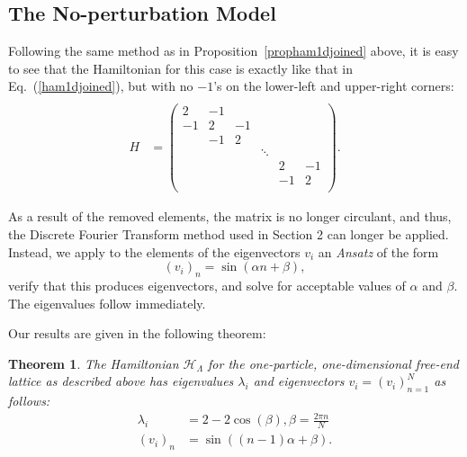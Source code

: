 \documentclass{article}
\newtheorem{theorem}{Theorem}
\numberwithin{equation}{section}
\numberwithin{theorem}{section}
\numberwithin{proposition}{section}
\numberwithin{lemma}{section}
\numberwithin{corollary}{section}
\numberwithin{definition}{section}
\begin{document}
\subsection{The No-perturbation Model}

Following the same method as in Proposition~\ref{propham1djoined} above, it is easy to see that the Hamiltonian for this case is exactly like that in Eq.~(\ref{ham1djoined}), but with no $-1$'s on the lower-left and upper-right corners:
	\begin{align*}
	\\ H &= \left(
		\begin{array}{cccccc}
			2 & -1 &  &  &  &  \\
			-1 & 2 & -1 &  &  &  \\
			 & -1 & 2 &  &  &  \\
			 &  &  & \ddots &  &  \\
			 &  &  &  & 2 & -1 \\
			 &  &  &  & -1 & 2 \\
		\end{array}
	\right).
	\end{align*}


	
As a result of the removed elements, the matrix is no longer circulant, and thus, the Discrete Fourier Transform method used in Section 2 can longer be applied. Instead, we apply to the elements of the eigenvectors $v_i$ an \textit{Ansatz} of the form
	\[
	(v_i)_n = \sin(\alpha n + \beta),
	\]
verify that this produces eigenvectors, and solve for acceptable values of $\alpha$ and $\beta$. The eigenvalues follow immediately.

Our results are given in the following theorem:

\begin{theorem}
	The Hamiltonian $\mathcal{H}_\Lambda$ for the one-particle, one-dimensional free-end lattice as described above has eigenvalues $\lambda_i$ and eigenvectors $v_i = (v_i)_{n=1}^N$ as follows:
	\begin{align}
	\lambda_i &= 2 - 2\cos(\beta), \beta = \frac{2 \pi n}{N} \\
	(v_i)_n &= \sin((n-1)\alpha + \beta).
	\end{align}
\end{theorem}
\end{document}
